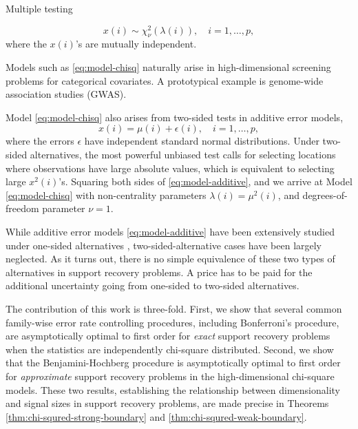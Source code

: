 
Multiple testing

\begin{equation} \label{eq:model-chisq}
    x(i) \sim \chi_\nu^2\left(\lambda(i)\right), \quad i=1,\ldots,p,
\end{equation}
where the $x(i)$'s are mutually independent.

Models such as \eqref{eq:model-chisq} naturally arise in high-dimensional screening problems for categorical covariates.
A prototypical example is genome-wide association studies (GWAS).



Model \eqref{eq:model-chisq} also arises from two-sided tests in additive error models,
\begin{equation} \label{eq:model-additive}
    x(i) = \mu(i) + \epsilon(i), \quad i=1,\ldots,p,
\end{equation}
where the errors $\epsilon$ have independent standard normal distributions.
Under two-sided alternatives, the most powerful unbiased test calls for selecting locations where observations have large absolute values, which is equivalent to selecting large $x^2(i)$'s.
Squaring both sides of \eqref{eq:model-additive}, and we arrive at Model \eqref{eq:model-chisq} with non-centrality parameters $\lambda(i) = \mu^2(i)$, and degrees-of-freedom parameter $\nu =1$.

While additive error models \eqref{eq:model-additive} have been extensively studied under one-sided alternatives \cite{arias2017distribution, butucea2018variable, gao2018fundamental}, two-sided-alternative cases have been largely neglected.
As it turns out, there is no simple equivalence of these two types of alternatives in support recovery problems.
A price has to be paid for the additional uncertainty going from one-sided to two-sided alternatives.

The contribution of this work is three-fold.
First, we show that several common family-wise error rate controlling procedures, including Bonferroni's procedure, are asymptotically optimal to first order for \emph{exact} support recovery problems when the statistics are independently chi-square distributed.
Second, we show that the Benjamini-Hochberg procedure is asymptotically optimal to first order for \emph{approximate} support recovery problems in the high-dimensional chi-square models.
These two results, establishing the relationship between dimensionality and signal sizes in support recovery problems, are made precise in Theorems \ref{thm:chi-squred-strong-boundary} and \ref{thm:chi-squred-weak-boundary}.

